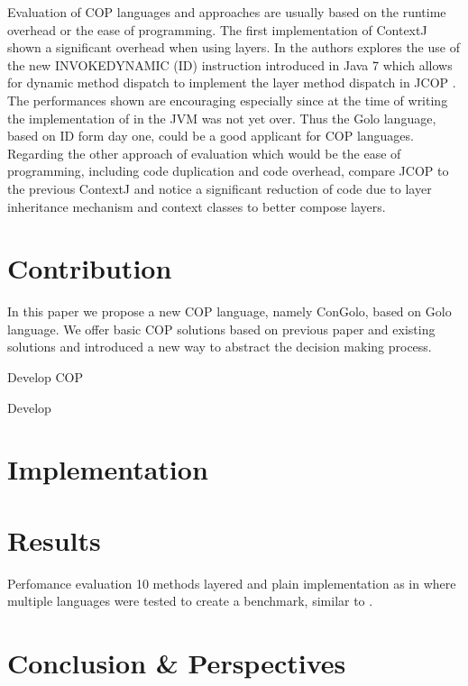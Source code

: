 \documentclass[a4paper]{article}
\begin{document}
Evaluation of COP languages and approaches are usually based on the runtime overhead or the ease of programming. The first implementation of ContextJ \cite{haupt_contextj:_2011} shown a significant overhead when using layers. In \cite{appeltauer_layered_2010} the authors explores the use of the new INVOKEDYNAMIC (ID) instruction introduced in Java 7 which allows for dynamic method dispatch to implement the layer method dispatch in JCOP \cite{appeltauer_declarative_2013}. The performances shown are encouraging especially since at the time of writing the implementation of in the JVM was not yet over. Thus the Golo language, based on ID form day one, could be a good applicant for COP languages. Regarding the other approach of evaluation which would be the ease of programming, including code duplication and code overhead, \cite{appeltauer_declarative_2013} compare JCOP to the previous ContextJ and notice a significant reduction of code due to layer inheritance mechanism and context classes to better compose layers.

 
\section{Contribution}
\label{section:contribution}

In this paper we propose a new COP language, namely ConGolo, based on Golo language. We offer basic COP solutions based on previous paper and existing solutions and introduced a new way to abstract the decision making process.

Develop COP

Develop 


\section{Implementation}
\label{section:implementation}

\section{Results}
\label{section:results}

Perfomance evaluation
10 methods layered and plain implementation as in \cite{appeltauer_comparison_2009} where multiple languages were tested to create a benchmark, similar to \cite{kamina_eventcj:_2011}.

\section{Conclusion \& Perspectives}
\label{section:conclusion}


%
%



\end{document}
